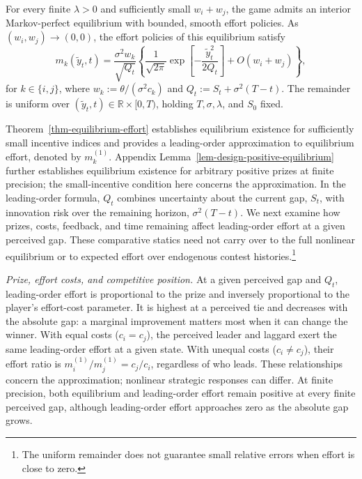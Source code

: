 \documentclass[mnsc]{informs3}
\begin{document}
\begin{theorem}\label{thm-equilibrium-effort}
{For every finite $\lambda>0$ and sufficiently small $w_i+w_j$, the game admits an interior Markov-perfect equilibrium with bounded, smooth effort policies. As $(w_i,w_j)\to(0,0)$, the effort policies of this equilibrium satisfy}
\begin{equation}\label{eq-equilibrium-effort}
m_k(\tilde y_t,t)
=\frac{\sigma^2w_k}{\sqrt{Q_t}}
\left\{
\frac{1}{\sqrt{2\pi}}
\exp\!\left[-\frac{\tilde y_t^2}{2Q_t}\right]
+O(w_i+w_j)
\right\},
\end{equation}
for $k\in\{i,j\}$, where $w_k:=\theta/(\sigma^2c_k)$ and $Q_t:=S_t+\sigma^2(T-t)$. The remainder is uniform over $(\tilde y_t,t)\in\mathbb R\times[0,T)$, holding $T,\sigma,\lambda$, and $S_0$ fixed.
\end{theorem}

Theorem~\ref{thm-equilibrium-effort} establishes equilibrium existence for sufficiently small incentive indices and provides a leading-order approximation to equilibrium effort, denoted by $m_k^{(1)}$. Appendix Lemma~\ref{lem-design-positive-equilibrium} further establishes equilibrium existence for arbitrary positive prizes at finite precision; the small-incentive condition here concerns the approximation. In the leading-order formula, $Q_t$ combines uncertainty about the current gap, $S_t$, with innovation risk over the remaining horizon, $\sigma^2(T-t)$. We next examine how prizes, costs, feedback, and time remaining affect leading-order effort at a given perceived gap. These comparative statics need not carry over to the full nonlinear equilibrium or to expected effort over endogenous contest histories.\footnote{The uniform remainder does not guarantee small relative errors when effort is close to zero.}

\textit{Prize, effort costs, and competitive position.} At a given perceived gap and $Q_t$, leading-order effort is proportional to the prize and inversely proportional to the player's effort-cost parameter. It is highest at a perceived tie and decreases with the absolute gap: a marginal improvement matters most when it can change the winner. With equal costs ($c_i=c_j$), the perceived leader and laggard exert the same leading-order effort at a given state. With unequal costs ($c_i\ne c_j$), their effort ratio is $m_i^{(1)}/m_j^{(1)}=c_j/c_i$, regardless of who leads. These relationships concern the approximation; nonlinear strategic responses can differ. At finite precision, both equilibrium and leading-order effort remain positive at every finite perceived gap, although leading-order effort approaches zero as the absolute gap grows.
\end{document}
